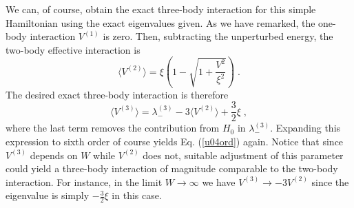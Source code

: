 \documentclass[prc,aps,amsmath,amssymb,preprintnumbers,showpacs,twocolumn]{revtex4}
\def\threehalf{{\textstyle{\frac{3}{2}}}}
\begin{document}
We can, of course, obtain the exact three-body interaction for this 
simple Hamiltonian using the exact eigenvalues given. As we have remarked,
the one-body interaction $V^{(1)}$ is zero. Then, subtracting the 
unperturbed energy, the two-body effective interaction is
\begin{equation}
\langle V^{(2)}\rangle=\xi\left(1-\sqrt{1+\frac{V^2}{\xi^2}}\right)\;.
\label{2bu0}
\end{equation}
The desired exact three-body interaction is therefore
\begin{equation}
\langle V^{(3)}\rangle=\lambda_-^{(3)}-3\langle V^{(2)}\rangle
+\threehalf\xi\;,\label{ex3}
\end{equation}
where the last term removes the contribution from $H_0$
in $\lambda_-^{(3)}$. Expanding this expression to sixth order of course 
yields Eq. (\ref{u04ord}) again.
Notice that since $V^{(3)}$ depends on $W$ while $V^{(2)}$ does not,
suitable adjustment of this parameter could yield a three-body 
interaction of magnitude comparable to the two-body interaction. For
instance, in the limit $W\rightarrow\infty$ we have 
$V^{(3)}\rightarrow-3V^{(2)}$
since the eigenvalue is simply $-\threehalf\xi$ in this case.
\end{document}
